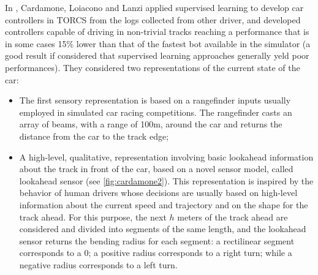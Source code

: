 In  \cite{cardamone}, Cardamone, Loiacono and Lanzi applied supervised learning to develop car controllers in TORCS from the logs collected from other driver, and developed controllers capable of driving in non-trivial tracks reaching a performance that is in some cases 15\% lower than that of the fastest bot available in
the simulator (a good result if considered that supervised learning approaches generally yeld poor performances).
They considered two representations of the current state of the car:
\begin{itemize}
\item The first sensory representation is based on a rangefinder inputs usually employed in simulated car racing competitions.
The rangefinder casts an array of beams, with a range of 100m, around the car and returns the distance from the car to the track edge;
\item  A high-level, qualitative, representation involving basic lookahead information about the track in front of the car, based on a  novel sensor model, called lookahead sensor (see \ref{fig:cardamone2}). This representation is inspired by the behavior of human drivers whose decisions are usually based on high-level information about the current speed and trajectory and on the shape for the track ahead. 
For this purpose, the next $h$ meters of the track ahead are considered and divided into segments of the same length, and the lookahead sensor returns the bending radius for each segment: a rectilinear segment corresponds to a $0$; a positive radius corresponds to a right turn; while a negative radius corresponds to a left turn. 
\end{itemize} 

